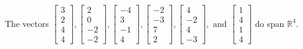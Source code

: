 \begin{exercise}
\begin{exerciseStatement}
  \end{exerciseStatement}
  \begin{exerciseAnswer}
   The vectors \(\left[\begin{array}{r}
3 \\
2 \\
4 \\
4
\end{array}\right] , \left[\begin{array}{r}
2 \\
0 \\
-2 \\
-2
\end{array}\right] , \left[\begin{array}{r}
-4 \\
3 \\
-1 \\
4
\end{array}\right] , \left[\begin{array}{r}
-2 \\
-3 \\
7 \\
2
\end{array}\right] , \left[\begin{array}{r}
4 \\
-2 \\
4 \\
-3
\end{array}\right] , \text{ and } \left[\begin{array}{r}
1 \\
4 \\
1 \\
4
\end{array}\right]\) 
  	 do  
	span \(\mathbb{R}^4\).
  


  \end{exerciseAnswer}
\end{exercise}